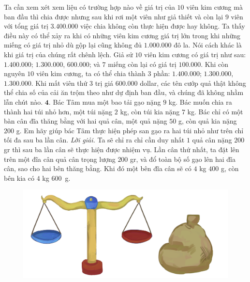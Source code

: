 \begin{multicols}{2}
\begin{figure}[H]
		\vspace*{-20pt}
	\end{figure}
	Ta cần xem xét xem liệu có trường hợp nào về giá trị của $10$ viên kim cương mà ban đầu thì chia được nhưng sau khi  rơi một viên như giả thiết và còn lại $9$ viên với tổng giá trị $3.400.000$ việc chia không còn thực hiện được hay không.
	Ta thấy điều này có thể xảy ra khi có những viên kim cương giá trị lớn trong khi những miếng có giá trị nhỏ dù gộp lại cũng không đủ $1.000.000$ đô la. Nói cách khác là khi giá trị của chúng rất chênh lệch. Giả sử  $10$ viên kim cương có  giá trị như sau:
	$1.400.000$;   $1.300.000$,  $600.000$;  và $7$ miếng còn lại có giá trị $100.000$.
	\vskip 0.1cm 
	Khi còn nguyên $10$ viên kim cương, ta có thể chia thành $3$ phần: $1.400.000$;   $1.300.000$, $1.300.000$.
	\vskip 0.1cm
	Khi mất viên thứ $3$ trị giá $600.000$ dollar, các tên cướp quả thật không thể chia số của cải ăn trộm theo như dự định ban đầu, và chúng đã không nhầm lẫn chút nào.
	\vskip 0.1cm
	$\pmb{4.}$ 	Bác Tâm mua một bao tải gạo nặng $9$ kg. Bác muốn chia ra thành hai túi nhỏ hơn, một túi nặng $2$ kg, còn túi kia nặng $7$ kg. Bác chỉ có một bàn cân đĩa thăng bằng với hai quả cân, một quả nặng $50$ g, còn quả kia nặng $200$ g. Em hãy giúp bác Tâm thực hiện phép san gạo ra hai túi nhỏ như trên chỉ tối đa sau ba lần cân.
	\vskip 0.1cm
	\textit{Lời giải.} Ta sẽ chỉ ra chỉ cần duy nhất $1$ quả cân nặng $200$ gr thì sau ba lần cân sẽ thực hiện được nhiệm vụ. Lần cân thứ nhất, ta đặt lên trên một đĩa cân quả cân trọng lượng $200$ gr, và đổ toàn bộ số gạo lên hai đĩa cân, sao cho hai bên thăng bằng. Khi đó một bên đĩa cân sẽ có $4$ kg $400$ g, còn bên kia có $4$ kg $600$~g.
	\begin{figure}[H]
		\centering
		\vspace*{-5pt}
		\captionsetup{labelformat= empty, justification=centering}
		\includegraphics[width=1\linewidth]{Hinh4}
		\vspace*{-15pt}
	\end{figure}

\end{multicols}
